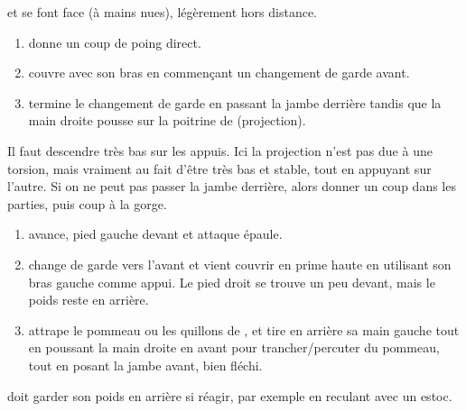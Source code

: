 \begin{exercice}
\label{att:ex:changement-garde-2-temps-projection}

\A et \D se font face (à mains nues), légèrement hors distance.

\begin{enumerate}
	\item \A donne un coup de poing direct.
	
	\item \D couvre avec son bras en commençant un changement de garde avant.
	
	\item \D termine le changement de garde en passant la jambe derrière \D tandis que la main droite pousse sur la poitrine de \A (projection).
\end{enumerate}

Il faut descendre très bas sur les appuis.
Ici la projection n'est pas due à une torsion, mais vraiment au fait d'être très bas et stable, tout en appuyant sur l'autre.
Si on ne peut pas passer la jambe derrière, alors donner un coup dans les parties, puis coup à la gorge.
\end{exercice}


\begin{technique}
\label{att:tech:changement-garde-2-temps-prime-haute}

\begin{enumerate}
	\item \D avance, pied gauche devant et \A attaque épaule.
	
	\item \D change de garde vers l'avant et vient couvrir en prime haute en utilisant son bras gauche comme appui.
	Le pied droit se trouve un peu devant, mais le poids reste en arrière.
	
	\item \D attrape le pommeau ou les quillons de \A, et tire en arrière sa main gauche tout en poussant la main droite en avant pour trancher/percuter du pommeau, tout en posant la jambe avant, bien fléchi.
\end{enumerate}

\D doit garder son poids en arrière si \A réagir, par exemple en reculant avec un estoc.

\end{technique}


